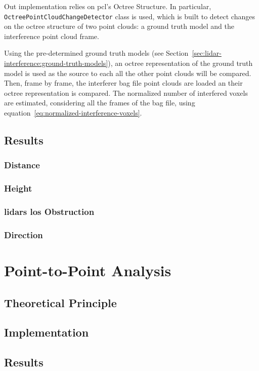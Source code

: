 Out implementation relies on \ac{pcl}'s Octree Structure. In particular, \texttt{OctreePointCloudChangeDetector} class is used, which is built to detect changes on the octree structure of two point clouds: a ground truth model and the interference point cloud frame. 

Using the pre-determined ground truth models (see Section~\ref{sec:lidar-interference:ground-truth-models}), an octree representation of the ground truth model is used as the source to each all the other point clouds will be compared. Then, frame by frame, the interferer bag file point clouds are loaded an their octree representation is compared. The normalized number of interfered voxels are estimated, considering all the frames of the bag file, using equation~\ref{eq:normalized-interference-voxels}.


\subsection{Results}

\subsubsection{Distance}
\subsubsection{Height}
\subsubsection{\acp{lidar} \ac{los} Obstruction}
\subsubsection{Direction}

\section{Point-to-Point Analysis}
\subsection{Theoretical Principle}
\subsection{Implementation}
\subsection{Results}
